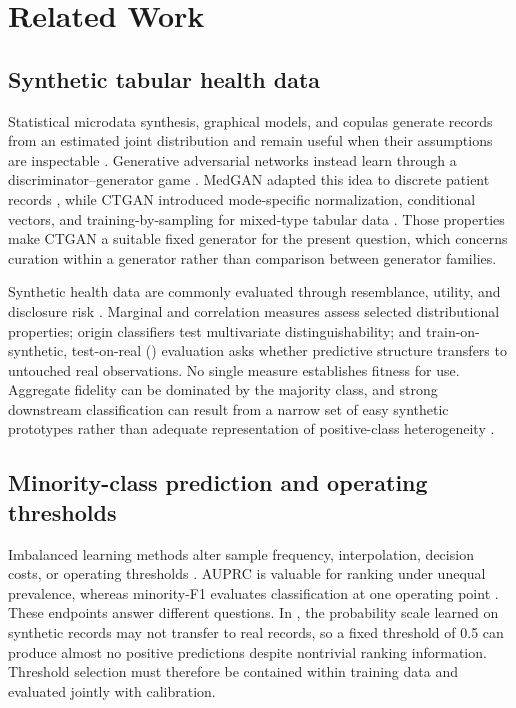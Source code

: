 \section{Related Work}
\label{sec:related-work}

\subsection{Synthetic tabular health data}

Statistical microdata synthesis, graphical models, and copulas generate records from an estimated joint distribution and remain useful when their assumptions are inspectable \citep{raghunathan2003,wang2021}. Generative adversarial networks instead learn through a discriminator--generator game \citep{goodfellow2014}. MedGAN adapted this idea to discrete patient records \citep{choi2017}, while CTGAN introduced mode-specific normalization, conditional vectors, and training-by-sampling for mixed-type tabular data \citep{xu2019}. Those properties make CTGAN a suitable fixed generator for the present question, which concerns curation within a generator rather than comparison between generator families.

Synthetic health data are commonly evaluated through resemblance, utility, and disclosure risk \citep{goncalves2020,hernandez2023,kaabachi2025}. Marginal and correlation measures assess selected distributional properties; origin classifiers test multivariate distinguishability; and train-on-synthetic, test-on-real (\tstr{}) evaluation asks whether predictive structure transfers to untouched real observations. No single measure establishes fitness for use. Aggregate fidelity can be dominated by the majority class, and strong downstream classification can result from a narrow set of easy synthetic prototypes rather than adequate representation of positive-class heterogeneity \citep{ghosheh2024,pezoulas2024}.

\subsection{Minority-class prediction and operating thresholds}

Imbalanced learning methods alter sample frequency, interpolation, decision costs, or operating thresholds \citep{chawla2002,he2009}. AUPRC is valuable for ranking under unequal prevalence, whereas minority-F1 evaluates classification at one operating point \citep{saito2015}. These endpoints answer different questions. In \tstr{}, the probability scale learned on synthetic records may not transfer to real records, so a fixed threshold of 0.5 can produce almost no positive predictions despite nontrivial ranking information. Threshold selection must therefore be contained within training data and evaluated jointly with calibration.

